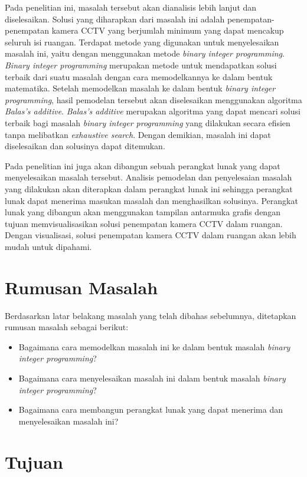 Pada penelitian ini, masalah tersebut akan dianalisis lebih lanjut dan diselesaikan. Solusi yang diharapkan dari masalah ini adalah penempatan-penempatan kamera CCTV yang berjumlah minimum yang dapat mencakup seluruh isi ruangan. Terdapat metode yang digunakan untuk menyelesaikan masalah ini, yaitu dengan menggunakan metode \textit{binary integer programming}. \textit{Binary integer programming} merupakan metode untuk mendapatkan solusi terbaik dari suatu masalah dengan cara memodelkannya ke dalam bentuk matematika. Setelah memodelkan masalah ke dalam bentuk \textit{binary integer programming}, hasil pemodelan tersebut akan diselesaikan menggunakan algoritma \textit{Balas's additive}. \textit{Balas's additive} merupakan algoritma yang dapat mencari solusi terbaik bagi masalah \textit{binary integer programming} yang dilakukan secara efisien tanpa melibatkan \textit{exhaustive search}. Dengan demikian, masalah ini dapat diselesaikan dan solusinya dapat ditemukan. 

Pada penelitian ini juga akan dibangun sebuah perangkat lunak yang dapat menyelesaikan masalah tersebut. Analisis pemodelan dan penyelesaian masalah yang dilakukan akan diterapkan dalam perangkat lunak ini sehingga perangkat lunak dapat menerima masukan masalah dan menghasilkan solusinya. Perangkat lunak yang dibangun akan menggunakan tampilan antarmuka grafis dengan tujuan memvisualisasikan solusi penempatan kamera CCTV dalam ruangan. Dengan visualisasi, solusi penempatan kamera CCTV dalam ruangan akan lebih mudah untuk dipahami.

\section{Rumusan Masalah}
\label{sec:rumusan}

Berdasarkan latar belakang masalah yang telah dibahas sebelumnya, ditetapkan rumusan masalah sebagai berikut:

\begin{itemize}
	\item Bagaimana cara memodelkan masalah ini ke dalam bentuk masalah \textit{binary integer programming}?
	\item Bagaimana cara menyelesaikan masalah ini dalam bentuk masalah \textit{binary integer programming}?
	\item Bagaimana cara membangun perangkat lunak yang dapat menerima dan menyelesaikan masalah ini?
\end{itemize}

\section{Tujuan}
\label{sec:tujuan}

